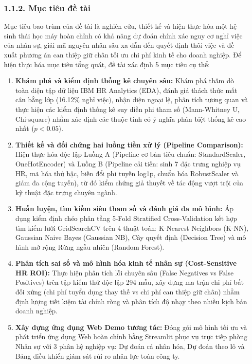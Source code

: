 \documentclass[12pt,a4paper]{article}
\begin{document}
\subsubsection{1.1.2. Mục tiêu đề tài}
Mục tiêu bao trùm của đề tài là nghiên cứu, thiết kế và hiện thực hóa một hệ sinh thái học máy hoàn chỉnh có khả năng dự đoán chính xác nguy cơ nghỉ việc của nhân sự, giải mã nguyên nhân sâu xa dẫn đến quyết định thôi việc và đề xuất phương án can thiệp giữ chân tối ưu chi phí kinh tế cho doanh nghiệp. Để hiện thực hóa mục tiêu tổng quát, đề tài xác định 5 mục tiêu cụ thể:
\begin{enumerate}
    \item \textbf{Khám phá và kiểm định thống kê chuyên sâu:} Khám phá thăm dò toàn diện tập dữ liệu IBM HR Analytics (EDA), đánh giá thách thức mất cân bằng lớp (16.12\% nghỉ việc), nhận diện ngoại lệ, phân tích tương quan và thực hiện các kiểm định thống kê suy diễn phi tham số (Mann-Whitney U, Chi-square) nhằm xác định các thuộc tính có ý nghĩa phân biệt thống kê cao nhất ($p < 0.05$).\n    \item \textbf{Thiết kế và đối chứng hai luồng tiền xử lý (Pipeline Comparison):} Hiện thực hóa độc lập Luồng A (Pipeline cơ bản tiêu chuẩn: StandardScaler, OneHotEncoder) và Luồng B (Pipeline cải tiến: sinh 7 đặc trưng nghiệp vụ HR, mã hóa thứ bậc, biến đổi phi tuyến log1p, chuẩn hóa RobustScaler và giảm đa cộng tuyến), từ đó kiểm chứng giả thuyết về tác động vượt trội của kỹ thuật đặc trưng chuyên ngành.
    \item \textbf{Huấn luyện, tìm kiếm siêu tham số và đánh giá đa mô hình:} Áp dụng kiểm định chéo phân tầng 5-Fold Stratified Cross-Validation kết hợp tìm kiếm lưới GridSearchCV trên 4 thuật toán: K-Nearest Neighbors (K-NN), Gaussian Naive Bayes (Gaussian NB), Cây quyết định (Decision Tree) và mô hình mở rộng Rừng ngẫu nhiên (Random Forest).
    \item \textbf{Phân tích sai số và mô hình hóa kinh tế nhân sự (Cost-Sensitive HR ROI):} Thực hiện phân tích lỗi chuyên sâu (False Negatives vs False Positives) trên tập kiểm thử độc lập 294 mẫu, xây dựng ma trận chi phí bất đối xứng (chi phí tuyển dụng thay thế vs chi phí can thiệp giữ chân) nhằm định lượng tiết kiệm tài chính ròng và phân tích độ nhạy theo nhiều kịch bản doanh nghiệp.
    \item \textbf{Xây dựng ứng dụng Web Demo tương tác:} Đóng gói mô hình tối ưu và phát triển ứng dụng Web hoàn chỉnh bằng Streamlit phục vụ trực tiếp phòng Nhân sự với 3 phân hệ nghiệp vụ: Dự đoán cá nhân hóa, Dự đoán theo lô và Bảng điều khiển giám sát rủi ro nhân lực toàn công ty.
\end{enumerate}
\end{document}
